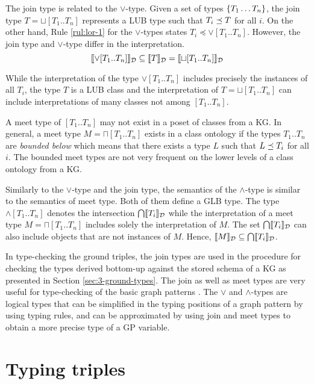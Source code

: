 \documentclass[runningheads]{llncs}
\newcommand{\llb}{\llbracket}
\newcommand{\rrb}{\rrbracket}
\begin{document}
The join type is related to the $\lor$-type. Given a set of types
$\{T_1\ldots\/T_n\}$, the join type $T=\sqcup[T_1..T_n]$ represents a
LUB type such that $T_i\preceq\/T$ for all $i$. On the other hand,
Rule \ref{rul:lor-1} for the $\lor$-types states
$T_i\preceq\lor[T_1..T_n]$. However, the join type and $\lor$-type
differ in the interpretation. 
$$\llb\lor[T_1..T_n]\rrb_\D\subseteq\llb\/T\rrb_\D=\llb\sqcup[T_1..T_n]\rrb_\D$$

While the interpretation of the type $\lor[T_1..T_n]$ includes
precisely the instances of all $T_i$, the type $T$ is a LUB class and
the interpretation of $T=\sqcup[T_1..T_n]$ can include interpretations
of many classes not among $[T_1..T_n]$.

A meet type of $[T_1..T_n]$ may not exist in a poset of classes from a
KG. In general, a meet type $M=\sqcap[T_1..T_n]$ exists in a class
ontology if the types $T_1..T_n$ are \emph{bounded below} which means
that there exists a type $L$ such that $L\preceq\/T_i$ for all
$i$. The bounded meet types \cite{Pierce2002} are not very frequent on
the lower levels of a class ontology from a KG.

Similarly to the $\lor$-type and the join type, the semantics of the
$\land$-type is similar to the semantics of meet type. Both of them
define a GLB type. The type $\land[T_1..T_n]$ denotes the intersection
$\bigcap\/\llb\/T_i\rrb_\D$ while the interpretation of a meet type
$M=\sqcap[T_1..T_n]$ includes solely the interpretation of $M$. The
set $\bigcap\/\llb\/T_i\rrb_\D$ can also include objects that are not
instances of $M$. Hence,
$\llb\/M\rrb_\D\subseteq\bigcap\/\llb\/T_i\rrb_\D$.

In type-checking the ground triples, the join types are used in the
procedure for checking the types derived bottom-up against the stored
schema of a KG as presented in Section \ref{sec:3-ground-types}. The
join as well as meet types are very useful for type-checking of the
basic graph patterns \cite{Savnik2025a}. The $\lor$ and $\land$-types
are logical types that can be simplified in the typing positions of a
graph pattern by using typing rules, and can be approximated by
using join and meet types to obtain a more precise type of a GP
variable.





\section{Typing triples\label{sec:triples}}
\end{document}

